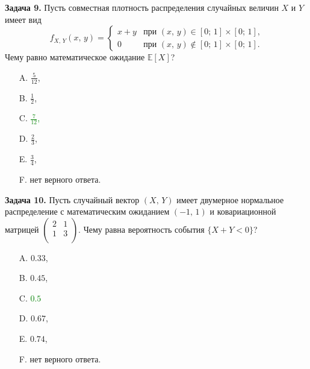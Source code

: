 \documentclass[a4paper, 12pt]{article}
\begin{document}
\textbf{Задача 9.} Пусть совместная плотность распределения случайных величин $X$ и $Y$ имеет вид
\[
    f_{X,\,Y}(x,\,y) =
    \left\{
      \begin{array}{ll}
        x + y & \text{при $(x,\,y) \in [0;\,1] \times [0;\,1]$,} \\
        0                & \text{при $(x,\,y) \not\in [0;\,1] \times [0;\,1]$.}
      \end{array}
    \right.
\]
Чему равно математическое ожидание $\mathbb{E}[X]$?
\begin{itemize}
  \item[A.] $\frac{5}{12}$,
  \item[B.] $\frac{1}{2}$,
  \item[C.] \textcolor{green}{$\frac{7}{12}$,}
  \item[D.] $\frac{2}{3}$,
  \item[E.] $\frac{3}{4}$,
  \item[F.] нет верного ответа.
\end{itemize}

\textbf{Задача 10.} Пусть случайный вектор $(X, \, Y)$ имеет двумерное нормальное распределение с математическим ожиданием $(-1, \,1)$ и ковариационной матрицей
$
\left(
  \begin{array}{cc}
    2 & 1 \\
    1 & 3 \\
  \end{array}
\right)
$.
Чему равна вероятность события $\{X + Y < 0\}$?
\begin{itemize}
  \item[A.] $0.33$,
  \item[B.] $0.45$,
  \item[C.] \textcolor{green}{$0.5$}
  \item[D.] $0.67$,
  \item[E.] $0.74$,
  \item[F.] нет верного ответа.
\end{itemize}
\end{document}
